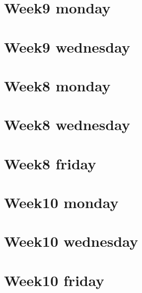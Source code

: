 
\section*{Week9 monday}

\vfill
\section*{Week9 wednesday}

\vfill
\section*{Week8 monday}

\vfill
\section*{Week8 wednesday}

\vfill
\section*{Week8 friday}

\vfill
\section*{Week10 monday}

\vfill
\section*{Week10 wednesday}

\vfill
\section*{Week10 friday}

\vfill
